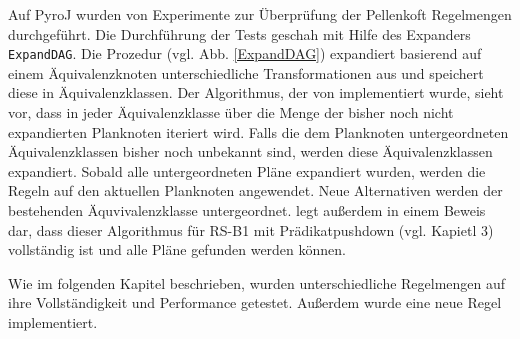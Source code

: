 Auf PyroJ wurden von \cite{shanbhag2014optimizing} Experimente zur Überprüfung der Pellenkoft Regelmengen durchgeführt. Die Durchführung der Tests geschah mit Hilfe des Expanders \texttt{ExpandDAG}. Die Prozedur (vgl. Abb. \ref{ExpandDAG}) expandiert basierend auf einem Äquivalenzknoten unterschiedliche Transformationen aus und speichert diese in Äquivalenzklassen. Der Algorithmus, der von \cite{roy2001multi} implementiert wurde, sieht vor, dass in jeder Äquivalenzklasse über die Menge der bisher noch nicht expandierten Planknoten iteriert wird. Falls die dem Planknoten untergeordneten Äquivalenzklassen bisher noch unbekannt sind, werden diese Äquivalenzklassen expandiert. Sobald alle untergeordneten Pläne expandiert wurden, werden die Regeln auf den aktuellen Planknoten angewendet. Neue Alternativen werden der bestehenden Äquvivalenzklasse untergeordnet.
\cite{roy2001multi} legt außerdem in einem Beweis dar, dass dieser Algorithmus für RS-B1 mit Prädikatpushdown (vgl. Kapietl 3) vollständig ist und alle Pläne gefunden werden können. 

Wie im folgenden Kapitel beschrieben, wurden unterschiedliche Regelmengen auf ihre Vollständigkeit und Performance getestet. Außerdem wurde eine neue Regel implementiert. 
